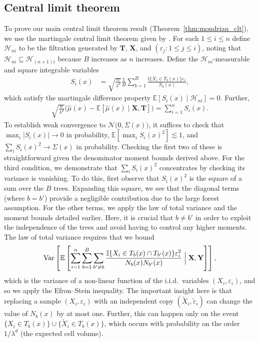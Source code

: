 \documentclass[11pt,lof]{puthesis}
\newcommand{\E}{\ensuremath{\mathbb{E}}}
\newcommand{\I}{\ensuremath{\mathbb{I}}}
\newcommand{\bY}{\ensuremath{\mathbf{Y}}}
\newcommand{\bX}{\ensuremath{\mathbf{X}}}
\newcommand{\bT}{\ensuremath{\mathbf{T}}}
\newcommand{\cH}{\ensuremath{\mathcal{H}}}
\newcommand{\cN}{\ensuremath{\mathcal{N}}}
\DeclareMathOperator{\Var}{Var}
\theoremstyle{break}
\theoremstyle{proof}
\begin{document}
\subsection*{Central limit theorem}

To prove our main central limit theorem result
(Theorem~\ref{thm:mondrian_clt}), we use
the martingale central limit theorem given by
\citet[Theorem~3.2]{hall1980martingale}. For each $1 \leq i \leq n$ define
$\cH_{n i}$ to be the filtration generated by $\bT$, $\bX$, and
$(\varepsilon_j : 1 \leq j \leq i)$, noting that
$\cH_{n i} \subseteq \cH_{(n+1)i}$ because $B$ increases as $n$ increases.
Define the $\cH_{n i}$-measurable and square integrable variables
%
\begin{align*}
S_i(x) &=
\sqrt{\frac{n}{\lambda^d}} \frac{1}{B} \sum_{b=1}^B
\frac{\I \{X_i \in T_b(x)\} \varepsilon_i} {N_{b}(x)},
\end{align*}
%
which satisfy the martingale difference property
$\E [ S_i(x) \mid \cH_{n i} ] = 0$. Further,
%
\begin{align*}
\sqrt{\frac{n}{\lambda^d}}
\big(
\hat\mu(x)
- \E\left[
\hat\mu(x) \mid \bX, \bT
\right]
\big)
= \sum_{i=1}^n S_i(x).
\end{align*}
%
To establish weak convergence to $\cN\big(0, \Sigma(x)\big)$,
it suffices to check that $\max_i |S_i(x)| \to 0$ in probability,
$\E\left[\max_i S_i(x)^2\right] \lesssim 1$,
and $\sum_i S_i(x)^2 \to \Sigma(x)$ in probability.
Checking the first two of these is straightforward given the denominator moment
bounds derived above. For the third condition, we demonstrate that
$\sum_i S_i(x)^2$ concentrates by checking its variance is vanishing. To do
this, first observe that $S_i(x)^2$ is the square of a sum over the $B$ trees.
Expanding this square, we see that the diagonal terms (where $b = b'$) provide
a negligible contribution due to the large forest assumption. For the other
terms, we apply the law of total variance and the moment bounds detailed
earlier. Here, it is crucial that $b \neq b'$ in order to exploit the
independence of the trees and avoid having to control any higher moments. The
law of total variance requires that we bound
%
\begin{align*}
\Var \left[
\E \left[
\sum_{i=1}^n \sum_{b=1}^B \sum_{b' \neq b}
\frac{\I\{X_i \in T_b(x) \cap T_{b'}(x)\} \varepsilon_i^2}
{N_{b}(x) N_{b'}(x)} \Bigm| \bX, \bY
\right]
\right],
\end{align*}
%
which is the variance of a non-linear function of the i.i.d.\ variables
$(X_i, \varepsilon_i)$, and so we apply the Efron--Stein inequality.
The important insight here is that replacing a sample
$(X_i, \varepsilon_i)$ with an independent copy
$(\tilde X_i, \tilde \varepsilon_i)$ can change the value of
$N_b(x)$ by at most one. Further, this can happen only on the event
$\{ X_i \in T_{b}(x) \} \cup \{ \tilde X_i \in T_{b}(x) \}$,
which occurs with probability on the order $1/\lambda^d$
(the expected cell volume).
\end{document}
